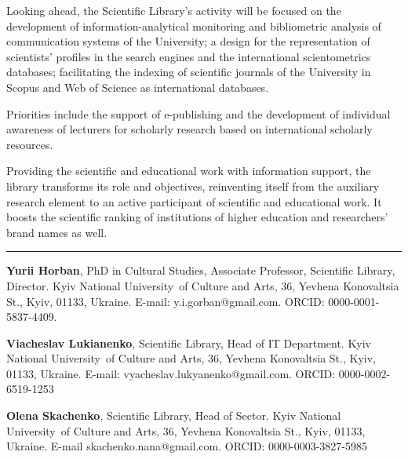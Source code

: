 \documentclass[a4paper,
fontsize=11pt,
oneside,
numbers=noperiodatend,
parskip=half-,
bibliography=totoc,
final
]{scrartcl}
\begin{document}
Looking ahead, the Scientific Library's activity will be focused on the
development of information-analytical monitoring and bibliometric
analysis of communication systems of the University; a design for the
representation of scientists' profiles in the search engines and the
international scientometrics databases; facilitating the indexing of
scientific journals of the University in Scopus and Web of Science as
international databases.

Priorities include the support of e-publishing and the development of
individual awareness of lecturers for scholarly research based on
international scholarly resources.

Providing the scientific and educational work with information support,
the library transforms its role and objectives, reinventing itself from
the auxiliary research element to an active participant of scientific
and educational work. It boosts the scientific ranking of institutions
of higher education and researchers' brand names as well.

\begin{center}\rule{0.5\linewidth}{0.5pt}\end{center}

\textbf{Yurii Horban}, PhD in Cultural Studies, Associate Professor,
Scientific Library, Director. Kyiv National University~of Culture and
Arts, 36, Yevhena Konovaltsia St., Kyiv, 01133, Ukraine. E-mail:
y.i.gorban@gmail.com. ORCID: 0000-0001-5837-4409.

\textbf{Viacheslav Lukianenko}, Scientific Library, Head of IT
Department. Kyiv National University~of Culture and Arts, 36, Yevhena
Konovaltsia St., Kyiv, 01133, Ukraine. E-mail:
vyacheslav.lukyanenko@gmail.com. ORCID: 0000-0002-6519-1253

\textbf{Olena Skachenko}, Scientific Library, Head of Sector. Kyiv
National University~of Culture and Arts, 36, Yevhena Konovaltsia St.,
Kyiv, 01133, Ukraine. E-mail skachenko.nana@gmail.com. ORCID:
0000-0003-3827-5985
\end{document}
